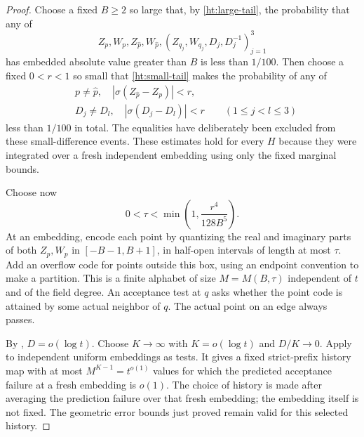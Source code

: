 \begin{proof}
Choose a fixed $B\ge2$ so large that, by \eqref{ht:large-tail}, the
probability that any of
\[
 Z_p,W_p,Z_{\widehat p},W_{\widehat p},
 (Z_{q_j},W_{q_j},D_j,D_j^{-1})_{j=1}^3
\]
has embedded absolute value greater than $B$ is less than $1/100$.
Then choose a fixed $0<r<1$ so small that
\eqref{ht:small-tail} makes the probability of any of
\begin{align*}
 &p\ne\widehat p,\quad
        |\sigma(Z_{\widehat p}-Z_p)|<r,\\
 &D_j\ne D_l,\quad |\sigma(D_j-D_l)|<r
       \qquad(1\le j<l\le3)
\end{align*}
less than $1/100$ in total. The equalities have deliberately been excluded
from these small-difference events. These estimates hold for every $H$
because they were integrated over a fresh independent embedding using
only the fixed marginal bounds.

Choose now
\begin{equation}\label{ht:mesh}
 0<\tau<\min\left(1,\frac{r^4}{128B^5}\right).
\end{equation}
At an embedding, encode each point by quantizing the real and imaginary
parts of both $Z_p,W_p$ in $[-B-1,B+1]$, in half-open intervals of length
at most $\tau$. Add an overflow code for points outside this box, using
an endpoint convention to make a partition. This is a finite alphabet
of size $M=M(B,\tau)$ independent of $t$ and of the field degree.
An acceptance test at $q$ asks whether the point code is attained by
some actual neighbor of $q$. The actual point on an edge always passes.

By , $D=o(\log t)$. Choose $K\to\infty$ with
$K=o(\log t)$ and $D/K\to0$. Apply  to independent
uniform embeddings as tests. It gives a fixed strict-prefix history map
with at most $M^{K-1}=t^{o(1)}$ values for which the predicted acceptance
failure at a fresh embedding is $o(1)$. The choice of history is made
after averaging the prediction failure over that fresh embedding; the
embedding itself is not fixed. The geometric error bounds just proved
remain valid for this selected history.


\end{proof}
